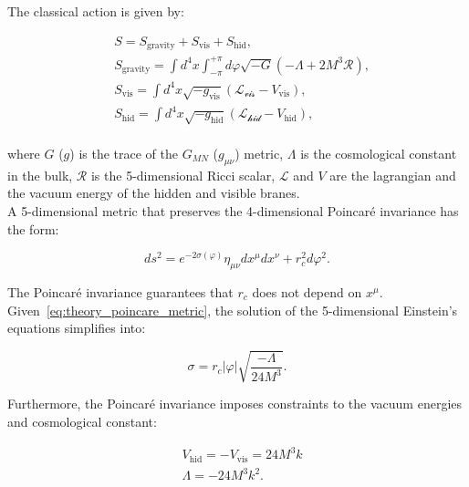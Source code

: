 \noindent The classical action is given by:

\begin{equation}
\begin{split}
 & S = S_{\text{gravity}} + S_{\text{vis}} + S_{\text{hid}},\\
 & S_{\text{gravity}} = \int d^4x \int_{-\pi}^{+\pi} d\varphi \sqrt{-G} \left( -\Lambda + 2 M^3 \mathcal{R} \right),\\
 & S_{\text{vis}} = \int d^4x \sqrt{-g_{\text{vis}}} \left( \mathcal{L_{\text{vis}}} -V_{\text{vis}} \right),\\
 & S_{\text{hid}} = \int d^4x \sqrt{-g_{\text{hid}}} \left( \mathcal{L_{\text{hid}}} -V_{\text{hid}} \right),\\
\end{split}
\label{eq:theory_classical_action}
\end{equation}

\noindent where $G$ ($g$) is the trace of the $G_{MN}$ ($g_{\mu \nu}$) metric, $\Lambda$ is the cosmological constant in the bulk, $\mathcal{R}$ is the 5-dimensional Ricci scalar, $\mathcal{L}$ and $V$ are the lagrangian and the vacuum energy of the hidden and visible branes.\\
A 5-dimensional metric that preserves the 4-dimensional Poincar\'e invariance has the form:

\begin{equation}
ds^2 = e^{-2 \sigma(\varphi)} \eta_{\mu \nu} dx^{\mu} dx^{\nu} + r_c^2 d{\varphi}^2.
\label{eq:theory_poincare_metric}
\end{equation}

\noindent The Poincar\'e invariance guarantees that $r_c$ does not depend on $x^{\mu}$. Given~\ref{eq:theory_poincare_metric}, the solution of the 5-dimensional Einstein's equations simplifies into:

\begin{equation}
\sigma = r_c \left| \varphi \right| \sqrt{\frac{- \Lambda}{24 M^3}}.
\label{eq:theory_einstein_solution}
\end{equation}


\noindent Furthermore, the Poincar\'e invariance imposes constraints to the vacuum energies and cosmological constant:

\begin{equation}
\begin{split}
 & V_{\text{hid}} = - V_{\text{vis}} = 24 M^3 k \\
 & \Lambda = -24 M^3 k^2.\\
\end{split}
\label{eq:theory_vacuum_energies}
\end{equation}

